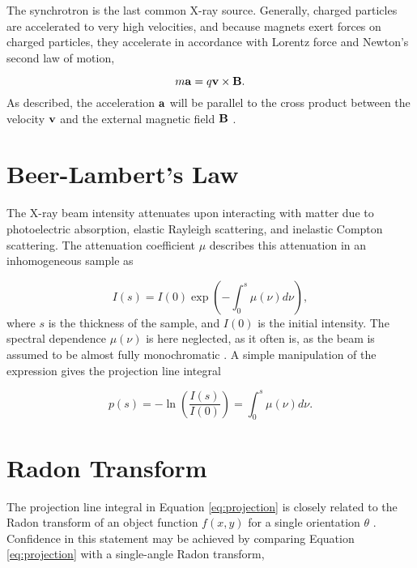 The synchrotron is the last common X-ray source.
Generally, charged particles are accelerated to very high velocities, and because magnets exert forces on charged particles, they accelerate in accordance with
Lorentz force and Newton's second law of motion,

\begin{equation}\label{eq:Lorentz_force}
    m\bm{\mathrm{a}} = q \bm{\mathrm{v}} \times \bm{\mathrm{B}}.
\end{equation}
As described, the acceleration $\bm{\mathrm{a}}$ will be parallel to the cross product between the velocity $\bm{\mathrm{v}}$ and the external magnetic field $\bm{\mathrm{B}}$ \cite{crater1994general}. %


\section{Beer-Lambert's Law}
The X-ray beam intensity attenuates upon interacting with matter due to photoelectric absorption, elastic Rayleigh scattering, and inelastic Compton scattering.
The attenuation coefficient $\mu$ describes this attenuation in an inhomogeneous sample as

\begin{equation}
    I(s) = I(0) \exp(- \int_{0}^{s} \mu(\nu) d\nu),
\end{equation}
\noindent
where $s$ is the thickness of the sample, and $I(0)$ is the initial intensity. The spectral dependence $\mu(\nu)$ is here neglected, as it often is, as the beam is assumed to be almost fully monochromatic \cite{buzug2009computed}.
A simple manipulation of the expression gives the projection line integral

\begin{equation}\label{eq:projection}
    p(s) = -\ln(\frac{I(s)}{I(0)} ) = \int_{0}^{s} \mu(\nu) d\nu.
\end{equation}

\section{Radon Transform}
The projection line integral in Equation \eqref{eq:projection} is closely related to the Radon transform of an object function $f(x,y)$ for a single orientation $\theta$ \cite{zeng2010medical}.
Confidence in this statement may be achieved by comparing Equation \eqref{eq:projection} with a single-angle Radon transform,


